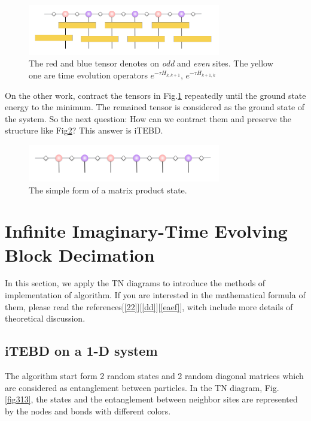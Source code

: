 \begin{figure}[ht]
	\centering
	\includegraphics[width=0.75\textwidth]{figures/fig312.png}
	\caption[The picture of the main idea of itebd.]{The red and blue tensor denotes on \textit{odd} and \textit{even} sites. The yellow one are time evolution operators $e^{-\tau H_{k,k+1}}$, $e^{-\tau H_{k+1,k}}$}
	\label{fig312}
\end{figure}

On the other work, contract the tensors in Fig.\ref{fig312} repeatedly until the ground state energy to the minimum. The remained tensor is considered as the ground state of the system. So the next question: How can we contract them and preserve the structure like Fig{\ref{fig311}}? This answer is iTEBD.

\begin{figure}[ht]
	\centering
	\includegraphics[width=0.75\textwidth]{figures/fig311.png}
	\caption[The picture of matrix product states]{The simple form of a matrix product state.}
	\label{fig311}
\end{figure}

\section{Infinite Imaginary-Time Evolving Block Decimation}
In this section, we apply the TN diagrams to introduce the methods of implementation of algorithm. If you are interested in the mathematical formula of them, please read the references[\ref{22}][\ref{dd}][\ref{eaef}], witch include more details of theoretical discussion.

\label{itebd}
\subsection{iTEBD on a 1-D system}

The algorithm start form 2 random states and 2 random diagonal matrices which are considered as entanglement between particles. In the TN diagram, Fig.\ref{fig313}, the states and the entanglement between neighbor sites are represented by the nodes and bonds with different colors.

